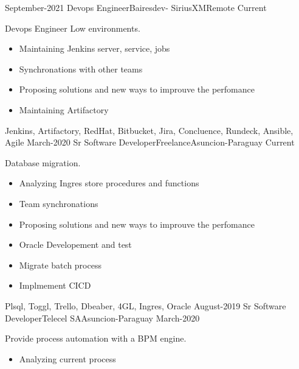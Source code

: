 %
%
%
\begin{experiences}
  \experience
  {September-2021} {Devops Engineer}{Bairesdev- SiriusXM}{Remote}
  {Current} {Devops Engineer Low environments.
                    \begin{itemize}
                        \item Maintaining Jenkins server, service, jobs
                        \item Synchronations with other teams
                        \item Proposing solutions and new ways to improuve the perfomance
                        \item Maintaining Artifactory
                     \end{itemize}
                }
                    {Jenkins, Artifactory, RedHat, Bitbucket, Jira, Concluence, Rundeck, Ansible, Agile}
 \emptySeparator
 \experience
    {March-2020} {Sr Software Developer}{Freelance}{Asuncion-Paraguay}
    {Current} {Database migration.
                      \begin{itemize}
                          \item Analyzing Ingres store procedures and functions
                          \item Team synchronations
                          \item Proposing solutions and new ways to improuve the perfomance
                          \item Oracle Developement and test
                          \item Migrate batch process
                          \item Implmement CICD
                       \end{itemize}
                  }
                      {Plsql, Toggl, Trello, Dbeaber, 4GL, Ingres, Oracle}
  \emptySeparator
 \experience
    {August-2019}   {Sr Software Developer}{Telecel SA}{Asuncion-Paraguay}
    {March-2020} {Provide process automation with a BPM engine.
                      \begin{itemize}
                          \item Analyzing current process

\end{itemize}}
\end{experiences}
